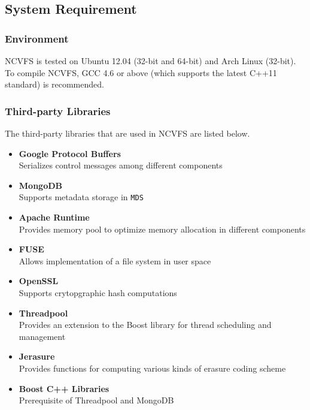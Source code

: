 \documentclass{article}
\def\mds{\texttt{MDS} }
\begin{document}
\subsection{System Requirement}

\subsubsection{Environment}

NCVFS is tested on Ubuntu 12.04 (32-bit and 64-bit) and Arch Linux (32-bit). 
To compile NCVFS, GCC 4.6 or above (which supports the latest C++11 standard) is recommended.

\subsubsection{Third-party Libraries}

The third-party libraries that are used in NCVFS are listed below.

\begin{itemize}

	\item \textbf {Google Protocol Buffers}\\
		Serializes control messages among different components
	\item \textbf {MongoDB}\\
		Supports metadata storage in \mds
	\item \textbf {Apache Runtime}\\
		Provides memory pool to optimize memory allocation in different components
	\item \textbf {FUSE}\\
		Allows implementation of a file system in user space
	\item \textbf {OpenSSL}\\
		Supports crytopgraphic hash computations
	\item \textbf {Threadpool}\\
		Provides an extension to the Boost library for thread scheduling and management
	\item \textbf {Jerasure}\\
		Provides functions for computing various kinds of erasure coding scheme
	\item \textbf {Boost C++ Libraries}\\
		Prerequisite of Threadpool and MongoDB

\end{itemize}
\end{document}
